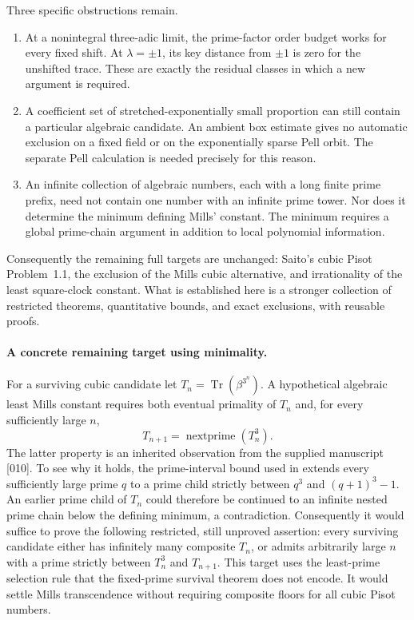 \documentclass[11pt,a4paper]{article}
\theoremstyle{definition}\newtheorem{definition}[theorem]{Definition}
\theoremstyle{remark}\newtheorem{remark}[theorem]{Remark}
\newcommand{\Tr}{\operatorname{Tr}}\newcommand{\Nm}{\operatorname{N}}
\begin{document}
Three specific obstructions remain.
\begin{enumerate}
\item At a nonintegral three-adic limit, the prime-factor order
budget works for every fixed shift. At $\lambda=\pm1$, its key
distance from $\pm1$ is zero for the unshifted trace. These are
exactly the residual classes in which a new argument is required.
\item A coefficient set of stretched-exponentially small proportion
can still contain a particular algebraic candidate. An ambient
box estimate gives no automatic exclusion on a fixed field or on
the exponentially sparse Pell orbit. The separate Pell calculation
is needed precisely for this reason.
\item An infinite collection of algebraic numbers, each with a
long finite prime prefix, need not contain one number with an
infinite prime tower. Nor does it determine the minimum defining
Mills' constant. The minimum requires a global prime-chain argument
in addition to local polynomial information.
\end{enumerate}
Consequently the remaining full targets are unchanged: Saito's
cubic Pisot Problem~1.1, the exclusion of the Mills cubic alternative,
and irrationality of the least square-clock constant. What is
established here is a stronger collection of restricted theorems, quantitative bounds, and exact exclusions, with reusable proofs.

\paragraph{A concrete remaining target using minimality.}
For a surviving cubic candidate let $T_n=\Tr(\beta^{3^n})$.
A hypothetical algebraic least Mills constant requires both eventual
primality of $T_n$ and, for every sufficiently large $n$,
\[
 T_{n+1}=\operatorname{nextprime}(T_n^3).
\]
The latter property is an inherited observation from the supplied
manuscript [010]. To see why it holds, the prime-interval bound used
in \cite{SaitoVariants} extends every sufficiently large prime $q$
to a prime child strictly between $q^3$ and $(q+1)^3-1$.
An earlier prime child of $T_n$ could therefore be continued to an
infinite nested prime chain below the defining minimum, a contradiction.
Consequently it would suffice to prove the following restricted,
still unproved assertion: every surviving candidate either has
infinitely many composite $T_n$, or admits arbitrarily large $n$
with a prime strictly between $T_n^3$ and $T_{n+1}$.
This target uses the least-prime selection rule that the fixed-prime
survival theorem does not encode. It would settle Mills transcendence
without requiring composite floors for all cubic Pisot numbers.
\end{document}
